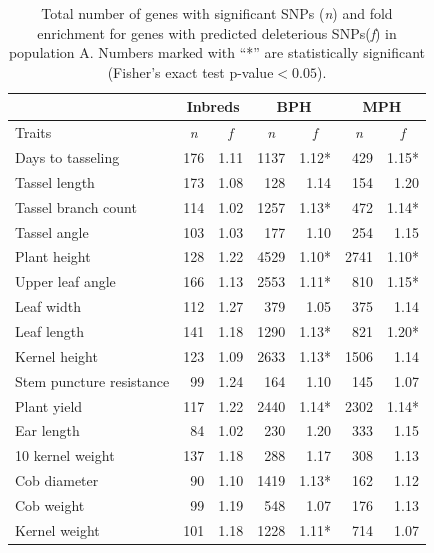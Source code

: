 \documentclass[12pt]{article}
\begin{document}
\begin{table}[!t]
  \begin{center}
    \caption[]{Total number of genes with significant SNPs (\emph{n}) and fold enrichment for genes with predicted deleterious SNPs(\emph{f}) in population A. Numbers marked with ``*'' are statistically significant (Fisher's exact test p-value$<0.05$).}
{\fontsize{10}{10}\sf
      \begin{tabular}{l|rr|rr|rr} 
\toprule
\multicolumn{1}{c}{}	&	\multicolumn{2}{c}{Inbreds}	&	\multicolumn{2}{c}{BPH}	&	\multicolumn{2}{c}{MPH}	\\	\hline 
Traits	& 	\multicolumn{1}{c}{\emph{n}} 	& 	\multicolumn{1}{c|}{\emph{f}}	& \multicolumn{1}{c}{\emph{n}} 	& 	\multicolumn{1}{c}{\emph{f}} 		& \multicolumn{1}{c}{\emph{n}} 	& 	\multicolumn{1}{c}{\emph{f}} 		\\	\hline \hline 
Days to tasseling	&	176	&	1.11	&	1137	&	1.12*	&	429	&	1.15*		\\
Tassel length	&	173	&	1.08	&	128	&	1.14	&	154	&	1.20	\\
Tassel branch count	&	114	&	1.02	&	1257	&	1.13*	&	472	&	1.14*		\\
Tassel angle	&	103	&	1.03	&	177	&	1.10	&	254	&	1.15	\\
Plant height	&	128	&	1.22	&	4529	&	1.10*	&	2741	&	1.10*	\\
Upper leaf angle	&	166	&	1.13	&	2553	&	1.11*	&	810	&	1.15*	\\
Leaf width	&	112	&	1.27	&	379	&	1.05	&	375	&	1.14	\\
Leaf length	&	141	&	1.18	&	1290	&	1.13*	&	821	&	1.20*	\\
Kernel height	&	123	&	1.09	&	2633	&	1.13*	&	1506	&	1.14	\\
Stem puncture resistance		&	99	&	1.24	&	164	&	1.10	&	145	&	1.07	\\
Plant yield		&	117	&	1.22	&	2440	&	1.14*	&	2302	&	1.14*		\\
Ear length		&	84	&	1.02	&	230	&	1.20	&	333	&	1.15	\\
10 kernel weight 	&	137	&	1.18	&	288	&	1.17	&	308	&	1.13	\\
Cob diameter	&	90	&	1.10	&	1419	&	1.13*	&	162	&	1.12	\\
Cob weight	&	99	&	1.19	&	548	&	1.07	&	176	&	1.13	\\
Kernel weight	&	101	&	1.18	&	1228	&	1.11*	&	714	&	1.07	\\
\bottomrule
      \end{tabular}
}
    \label{gene_enrichment_A}  
  \end{center}
\end{table}
\end{document}
